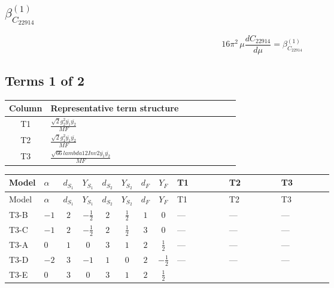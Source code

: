\documentclass[8pt]{article}
\begin{document}
\begin{landscape}
\section*{$\beta_{C_{22914}}^{(1)}$}
\[16\pi^2\,\mu\frac{d C_{22914}}{d\mu}=\beta_{C_{22914}}^{(1)}\]
\subsection*{Terms 1 of 2}
\begin{center}
\begin{tabular}{@{}c >{\raggedright\arraybackslash}p{0.82\linewidth}@{}}
\toprule
Column & Representative term structure \\
\midrule
T1 & \(\displaystyle \frac{\sqrt{2} g_{2}^{2} \overline{y_{1}} \overline{y_{2}}}{MF}\) \\
\midrule
T2 & \(\displaystyle \frac{\sqrt{2} g_{1}^{2} \overline{y_{1}} \overline{y_{2}}}{MF}\) \\
\midrule
T3 & \(\displaystyle \frac{\sqrt{66} lambda12Inv2 \overline{y_{1}} \overline{y_{2}}}{MF}\) \\
\midrule
\bottomrule
\end{tabular}
\end{center}
\smallskip
\tiny
\begin{longtable}{@{}llcccccc >{\raggedright\arraybackslash}p{0.21\linewidth} >{\raggedright\arraybackslash}p{0.21\linewidth} >{\raggedright\arraybackslash}p{0.21\linewidth}@{}}
\toprule
Model & $\alpha$ & $d_{S_1}$ & $Y_{S_1}$ & $d_{S_2}$ & $Y_{S_2}$ & $d_F$ & $Y_F$ & T1 & T2 & T3 \\
\midrule
\endfirsthead
\toprule
Model & $\alpha$ & $d_{S_1}$ & $Y_{S_1}$ & $d_{S_2}$ & $Y_{S_2}$ & $d_F$ & $Y_F$ & T1 & T2 & T3 \\
\midrule
\endhead
T3-B & $-1$ & $2$ & $-\frac{1}{2}$ & $2$ & $\frac{1}{2}$ & $1$ & $0$ & --- & --- & --- \\
\midrule
T3-C & $-1$ & $2$ & $-\frac{1}{2}$ & $2$ & $\frac{1}{2}$ & $3$ & $0$ & --- & --- & --- \\
\midrule
T3-A & $0$ & $1$ & $0$ & $3$ & $1$ & $2$ & $\frac{1}{2}$ & --- & --- & --- \\
\midrule
T3-D & $-2$ & $3$ & $-1$ & $1$ & $0$ & $2$ & $-\frac{1}{2}$ & --- & --- & --- \\
\midrule
T3-E & $0$ & $3$ & $0$ & $3$ & $1$ & $2$ & $\frac{1}{2}$ & \scriptsize\adjustbox{max width=\linewidth}{$\begin{gathered} - \frac{33 \sqrt{2} g_{2}^{2} \overline{y_{1}} \overline{y_{2}}}{16 MF}\end{gathered}$} & \scriptsize\adjustbox{max width=\linewidth}{$\begin{gathered} - \frac{3 \sqrt{2} g_{1}^{2} \overline{y_{1}} \overline{y_{2}}}{16 MF}\end{gathered}$} & \scriptsize\adjustbox{max width=\linewidth}{$\begin{gathered} - \frac{3 \sqrt{66} lambda12Inv2 \overline{y_{1}} \overline{y_{2}}}{44 MF}\end{gathered}$} \\
\midrule
\bottomrule
\end{longtable}
\clearpage

\end{landscape}
\end{document}
